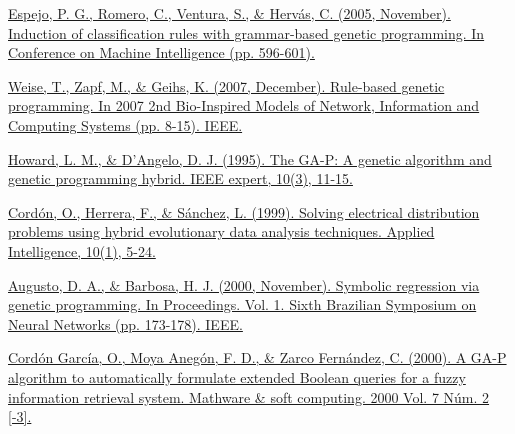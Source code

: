 \begin{thebibliography}{9}

	\href{https://www.researchgate.net/profile/Sebastian-Ventura/publication/228722056_C_Induction_of_Classification_Rules_with_Grammar-Based_Genetic_Programming/links/09e41510a07a3e3047000000/C-Induction-of-Classification-Rules-with-Grammar-Based-Genetic-Programming.pdf}{Espejo, P. G., Romero, C., Ventura, S., \& Hervás, C. (2005, November). Induction of classification rules with grammar-based genetic programming. In Conference on Machine Intelligence (pp. 596-601).}


	\href{https://ieeexplore.ieee.org/abstract/document/4610073}{Weise, T., Zapf, M., \& Geihs, K. (2007, December). Rule-based genetic programming. In 2007 2nd Bio-Inspired Models of Network, Information and Computing Systems (pp. 8-15). IEEE.}


	\href{https://ieeexplore.ieee.org/stamp/stamp.jsp?tp=&arnumber=393137}{Howard, L. M., \& D'Angelo, D. J. (1995). The GA-P: A genetic algorithm and genetic programming hybrid. IEEE expert, 10(3), 11-15.}


	\href{https://link.springer.com/article/10.1023/A:1008384630089}{Cordón, O., Herrera, F., \& Sánchez, L. (1999). Solving electrical distribution problems using hybrid evolutionary data analysis techniques. Applied Intelligence, 10(1), 5-24.}



	\href{https://ieeexplore.ieee.org/document/889734}{Augusto, D. A., \& Barbosa, H. J. (2000, November). Symbolic regression via genetic programming. In Proceedings. Vol. 1. Sixth Brazilian Symposium on Neural Networks (pp. 173-178). IEEE.}


	\href{https://upcommons.upc.edu/handle/2099/3586}{Cordón García, O., Moya Anegón, F. D., \& Zarco Fernández, C. (2000). A GA-P algorithm to automatically formulate extended Boolean queries for a fuzzy information retrieval system. Mathware \& soft computing. 2000 Vol. 7 Núm. 2 [-3].}



\end{thebibliography}
